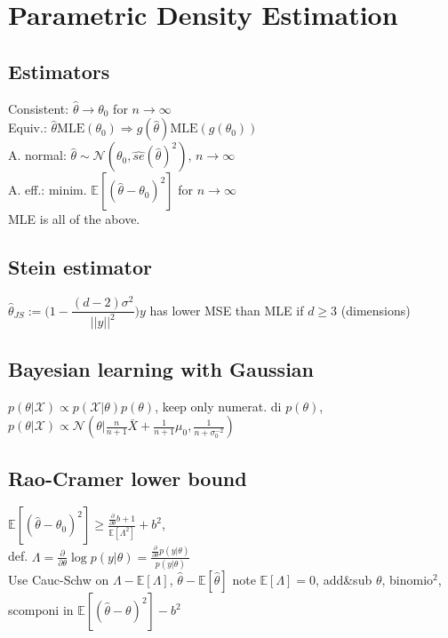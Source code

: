 \section*{Parametric Density Estimation}
\subsection*{Estimators}
Consistent: $\hat{\theta}\rightarrow\theta_0$ for $n\rightarrow\infty$\\
Equiv.: $\hat{\theta} \mathrm{MLE}(\theta_0) \Rightarrow g(\hat{\theta}) \mathrm{MLE}(g(\theta_0))$ \\
A. normal: $\hat{\theta}\sim\mathcal{N}(\theta_0, \hat{se}(\hat{\theta})^2)$, $n\rightarrow\infty$\\
A. eff.: minim. $\mathbb{E}[(\hat{\theta} - \theta_0)^2]$ for $n\rightarrow\infty$\\
MLE is all of the above. \\

\subsection*{Stein estimator}
$\hat{\theta}_{JS} := \Big(1 - \dfrac{(d-2)\sigma^2}{||y||^2} \Big) y$ has lower MSE than MLE if $d \geq 3$ (dimensions)

\subsection*{Bayesian learning with Gaussian}
$p(\theta|\mathcal{X}) \propto p(\mathcal{X}|\theta)p(\theta) $, keep only numerat. di $p(\theta)$, \\
$p(\theta|\mathcal{X}) \propto \mathcal{N}(\theta|\frac{n}{n+1}\bar{X}+\frac1{n+1}\mu_0, \frac1{n+\sigma_0^{-2}})$

\subsection*{Rao-Cramer lower bound}
$\mathbb{E}[(\hat{\theta} - \theta_0)^2] \geq \frac{\frac{\partial}{\partial\theta}b + 1}{\mathbb{E}[\Lambda^2]}+b^2$, \\ def.
$\Lambda = \frac{\partial}{\partial\theta}\log p(y|\theta)=\frac{\frac{\partial}{\partial\theta}p(y|\theta)}{p(y|\theta)}$ \\
Use Cauc-Schw on $\Lambda-\mathbb{E}[\Lambda]$, $\hat{\theta}-\mathbb{E}[\hat{\theta}]$ note $\mathbb{E}[\Lambda]=0$, add\&sub $\theta$, binomio$^2$, scomponi in $\mathbb{E}[(\hat\theta -\theta)^2] - b^2$

